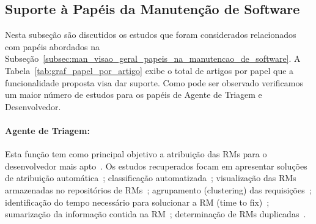 \subsection{Suporte à Papéis da Manutenção de Software}
\label{sub:extensões_com_suporte_a_papeis}

Nesta subseção são discutidos os estudos que foram considerados relacionados com
papéis abordados na
Subseção~\ref{subsec:man_visao_geral_papeis_na_manutencao_de_software}. A
Tabela~\ref{tab:graf_papel_por_artigo} exibe o total de artigos por papel que a
funcionalidade proposta visa dar suporte.  Como pode ser observado verificamos
um maior número de estudos para os papéis de Agente de Triagem e Desenvolvedor.


\begin{table}[htpb]
\centering
{}
\caption{Total de artigos por papel na manutenção de software}
\label{tab:graf_papel_por_artigo}
\end{table}

\paragraph{Agente de Triagem:}

Esta função tem como principal objetivo a atribuição das RMs para o
desenvolvedor mais apto~\cite{banitaan2013decoba}.  Os estudos recuperados focam
em apresentar soluções de atribuição automática~\cite{banitaan2013decoba,
    shokripour2012automatic, somasundaram2012automatic, Naguib2013, Zhang2014,
    Zanetti2013}; classificação
automatizada~\cite{gegick2010identifying,liu2014faceted, behl2014bug,
    chawla2015automated,tian2015automated}; visualização das RMs armazenadas no
repositórios de RMs~\cite{izquierdo2015gila}; agrupamento (clustering) das
requisições~\cite{liu2014faceted}; identificação do tempo necessário para
solucionar a RM (time to fix)~\cite{hosseini2012market,
    Bhattacharya:2011:BTP:1985441.1985472}; sumarização da informação contida na
RM~\cite{mani2012ausum}; determinação de RMs duplicadas~\cite{Sun2011, Wu2011a}.

